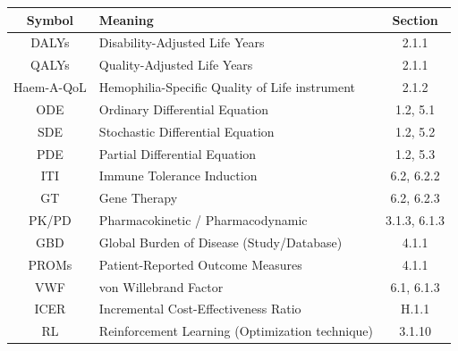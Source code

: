
\begin{longtable}{@{\extracolsep{\fill}} c l c @{}}
\textbf{Symbol} & \textbf{Meaning} & \textbf{Section} \\
\hline
\endhead

DALYs & Disability-Adjusted Life Years & 2.1.1 \\
QALYs & Quality-Adjusted Life Years & 2.1.1 \\
Haem-A-QoL & Hemophilia-Specific Quality of Life instrument & 2.1.2 \\
ODE & Ordinary Differential Equation & 1.2, 5.1 \\
SDE & Stochastic Differential Equation & 1.2, 5.2 \\
PDE & Partial Differential Equation & 1.2, 5.3 \\
ITI & Immune Tolerance Induction & 6.2, 6.2.2 \\
GT & Gene Therapy & 6.2, 6.2.3 \\
PK/PD & Pharmacokinetic / Pharmacodynamic & 3.1.3, 6.1.3 \\
GBD & Global Burden of Disease (Study/Database) & 4.1.1 \\
PROMs & Patient-Reported Outcome Measures & 4.1.1 \\
VWF & von Willebrand Factor & 6.1, 6.1.3 \\
ICER & Incremental Cost-Effectiveness Ratio & H.1.1 \\
RL & Reinforcement Learning (Optimization technique) & 3.1.10 \\

\end{longtable}